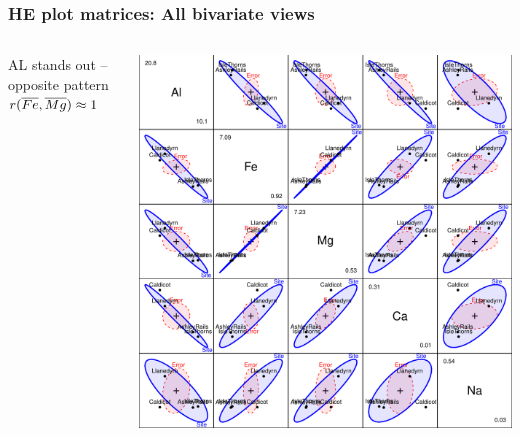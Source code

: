 \begin{frame}
	\frametitle{HE plot matrices: All bivariate views}
  \begin{columns}[c]
    \begin{column}{.25\textwidth}
	  AL stands out -- opposite pattern
    \vspace{3ex}
	  $r(\overline{Fe}, \overline{Mg}) \approx 1$
    \hyperlink{lowrank<1>}{}
    \end{column}
    \begin{column}{.75\textwidth}
		\begin{center}
	      \includegraphics[height=.75\textheight,clip]{figures/pottery-HE3}
		  \\
		\end{center}
    \end{column}
  \end{columns}
\end{frame}
